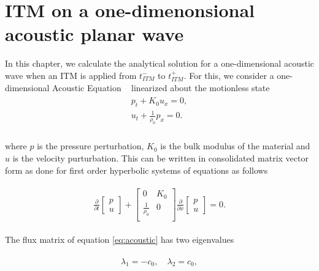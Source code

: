 
\section{\ac{ITM} on a one-dimenonsional acoustic planar wave}\label{section:ITMAcoustic}
In this chapter, we calculate the analytical solution for a one-dimensional acoustic wave when an \ac{ITM} is applied from $t_{ITM}^-$ to $t_{ITM}^+$.
For this, we consider a one-dimensional Acoustic Equation ~\parencite[Sec. 2.8]{leveque_2002} linearized about the motionless state
\begin{align}
    \begin{split}
        p_t + K_0u_x = 0, \\
        u_t + \frac{1}{\rho_0}p_x = 0 .\\
    \end{split}
\end{align}

where $p$ is the pressure perturbation, $K_0$ is the bulk modulus of the material and $u$ is the velocity purturbation. 
This can be written in consolidated matrix vector form as done for first order hyperbolic systems of equations as follows

\begin{align}
    \begin{split}
        \frac{\partial }{\partial t}
    \begin{bmatrix}
        p \\
        u
    \end{bmatrix} + 
    \begin{bmatrix}
        0 & K_0 \\
        \frac{1}{\rho_0} & 0 \\
    \end{bmatrix}
    \frac{\partial }{\partial x}
    \begin{bmatrix}
        p \\
        u
    \end{bmatrix} = 0 .
    \end{split}
    \label{eq:acoustic}
\end{align}

The flux matrix of equation \ref{eq:acoustic} has two eigenvalues

\begin{align}
    \begin{split}
        \lambda_1 = -c_0, \quad \lambda_2 = c_0,
    \end{split}
\end{align}

